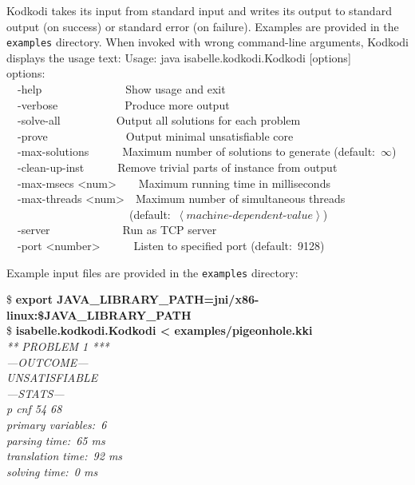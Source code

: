 \documentclass[a4paper,12pt]{article}
\begin{document}
    Kodkodi takes its input from standard input and writes its output to standard
    output (on success) or standard error (on failure). Examples are provided in the
    \texttt{examples} directory. When invoked with wrong command-line arguments,
    Kodkodi displays the usage text:
%
    \pre
    \ttfamily\small
    Usage: java isabelle.kodkodi.Kodkodi [options] \\
    options: \\
    \hbox{}~~-help~~~~~~~~~~~~~~~Show usage and exit \\
    \hbox{}~~-verbose~~~~~~~~~~~~Produce more output \\
    \hbox{}~~-solve-all~~~~~~~~~~Output all solutions for each problem \\
    \hbox{}~~-prove~~~~~~~~~~~~~~Output minimal unsatisfiable core \\
    \hbox{}~~-max-solutions~~~~~~Maximum number of solutions to generate (default:~$\infty$) \\
    \hbox{}~~-clean-up-inst~~~~~~Remove trivial parts of instance from output \\
    \hbox{}~~-max-msecs <num>~~~~Maximum running time in milliseconds \\
    \hbox{}~~-max-threads <num>~~Maximum number of simultaneous threads \\ \hbox{}~~~~~~~~~~~~~~~~~~~~~~(default:~$\left<\textit{machine-dependent-value}\right>$) \\
    \hbox{}~~-server~~~~~~~~~~~~~Run as TCP server \\
    \hbox{}~~-port <number>~~~~~~Listen to specified port (default:~9128)
    \post

    Example input files are provided in the \texttt{examples} directory:

    \pre
    \ttfamily\small
    \$ \textbf{export JAVA\_LIBRARY\_PATH=jni/x86-linux:\$JAVA\_LIBRARY\_PATH} \\
    \$ \textbf{isabelle.kodkodi.Kodkodi < examples/pigeonhole.kki} \\
    \slshape *** PROBLEM 1 *** \\[2\smallskipamount]
    ---OUTCOME--- \\
    UNSATISFIABLE \\[2\smallskipamount]
    ---STATS--- \\
    p cnf 54 68 \\
    primary variables:~6 \\
    parsing time:~65 ms \\
    translation time:~92 ms \\
    solving time:~0 ms
    \post
\end{document}
